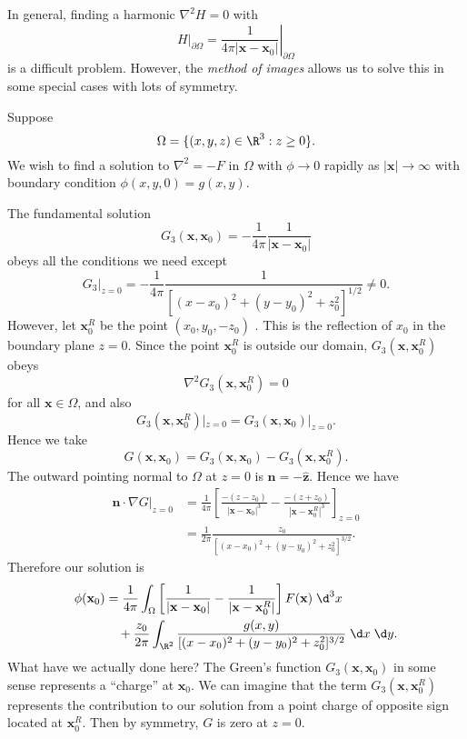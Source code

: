 \documentclass[a4paper]{article}
\begin{document}
In general, finding a harmonic $\nabla^2 H = 0$ with
\[
  H|_{\partial \Omega} = \left.\frac{1}{4\pi |\mathbf{x} - \mathbf{x}_0|}\right|_{\partial \Omega}
\]
is a difficult problem. However, the \emph{method of images} allows us to solve this in some special cases with lots of symmetry.

\begin{eg}
  Suppose
  \[
    \Omega = \{(x, y, z) \in \R^3: z \geq 0\}.
  \]
  We wish to find a solution to $\nabla^2 = -F$ in $\Omega$ with $\phi \to 0$ rapidly as $|\mathbf{x}| \to \infty$ with boundary condition $\phi(x, y, 0) = g(x, y)$.

  The fundamental solution
  \[
    G_3(\mathbf{x}, \mathbf{x}_0) = -\frac{1}{4\pi} \frac{1}{|\mathbf{x} - \mathbf{x}_0|}
  \]
  obeys all the conditions we need except
  \[
    G_3|_{z = 0} = -\frac{1}{4\pi} \frac{1}{[(x - x_0)^2 + (y - y_0)^2 + z_0^2]^{1/2}} \not= 0.
  \]
  However, let $\mathbf{x}_0^R$ be the point $(x_0, y_0, -z_0)$ . This is the reflection of $x_0$ in the boundary plane $z = 0$. Since the point $\mathbf{x}_0^R$ is outside our domain, $G_3(\mathbf{x}, \mathbf{x}_0^R)$ obeys
  \[
    \nabla^2 G_3(\mathbf{x}, \mathbf{x}_0^R) = 0
  \]
  for all $\mathbf{x} \in \Omega$, and also
  \[
    G_3(\mathbf{x}, \mathbf{x}_0^R)|_{z = 0} = G_3(\mathbf{x}, \mathbf{x}_0)|_{z = 0}.
  \]
  Hence we take
  \[
    G(\mathbf{x}, \mathbf{x}_0) = G_3(\mathbf{x}, \mathbf{x}_0) - G_3(\mathbf{x}, \mathbf{x}_0^R).
  \]
  The outward pointing normal to $\Omega$ at $z = 0$ is $\mathbf{n} = -\hat{\mathbf{z}}$. Hence we have
  \begin{align*}
    \mathbf{n} \cdot \nabla G|_{z = 0} &= \frac{1}{4\pi} \left[\frac{-(z - z_0)}{|\mathbf{x} - \mathbf{x}_0|^3} - \frac{-(z + z_0)}{|\mathbf{x} - \mathbf{x}_0^R|^3}\right]_{z = 0} \\
    &= \frac{1}{2\pi} \frac{z_0}{[(x - x_0)^2 + (y - y_0)^2 + z_0^2]^{3/2}}.
  \end{align*}
  Therefore our solution is
  \begin{align*}
    \phi(\mathbf{x}_0) &= \frac{1}{4\pi} \int_\Omega \left[\frac{1}{|\mathbf{x} - \mathbf{x}_0|} - \frac{1}{|\mathbf{x} - \mathbf{x}_0^R|}\right] F(\mathbf{x})\;\d^3 x \\
    &\quad + \frac{z_0}{2\pi} \int_{\R^2} \frac{g(x, y)}{[(x - x_0)^2 + (y - y_0)^2 + z_0^2]^{3/2}} \;\d x \;\d y.
  \end{align*}
  What have we actually done here? The Green's function $G_3(\mathbf{x}, \mathbf{x}_0)$ in some sense represents a ``charge'' at $\mathbf{x}_0$. We can imagine that the term $G_3(\mathbf{x}, \mathbf{x}_0^R)$ represents the contribution to our solution from a point charge of opposite sign located at $\mathbf{x}_0^R$. Then by symmetry, $G$ is zero at $z = 0$.

\end{eg}
\end{document}
